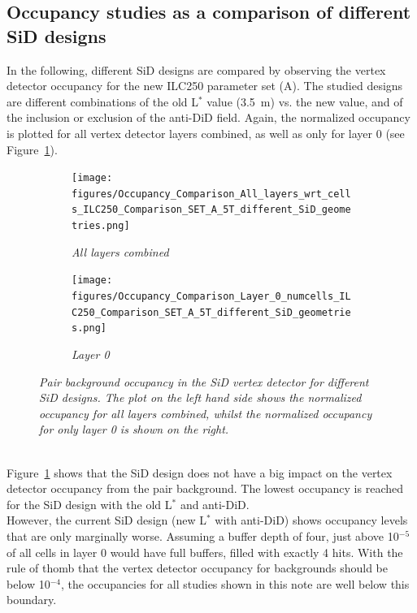 \subsection{Occupancy studies as a comparison of different SiD designs}
In the following, different SiD designs are compared by observing the vertex detector occupancy for the new ILC250 parameter set (A).
The studied designs are different combinations of the old L$^*$ value (\SI{3.5}{\meter}) vs. the new value, and of the inclusion or exclusion of the anti-DiD field.
Again, the normalized occupancy is plotted for all vertex detector layers combined, as well as only for layer 0 (see Figure~\ref{fig:SiD_comparison}).
\begin{figure}[!h]
\centering
\begin{subfigure}[t]{0.45\textwidth}
\centering
\texttt{[image: figures/Occupancy\_Comparison\_All\_layers\_wrt\_cells\_ILC250\_Comparison\_SET\_A\_5T\_different\_SiD\_geometries.png]}
\caption{\textit{All layers combined}}
\end{subfigure}
\hspace*{0.3cm}
\begin{subfigure}[t]{0.45\textwidth}
\centering
\texttt{[image: figures/Occupancy\_Comparison\_Layer\_0\_numcells\_ILC250\_Comparison\_SET\_A\_5T\_different\_SiD\_geometries.png]}
\caption{\textit{Layer 0}}
\end{subfigure}
\caption{\textit{Pair background occupancy in the SiD vertex detector for different SiD designs.
The plot on the left hand side shows the normalized occupancy for all layers combined, whilst the normalized occupancy for only layer 0 is shown on the right.}}
\label{fig:SiD_comparison}
\end{figure}
\\Figure~\ref{fig:SiD_comparison} shows that the SiD design does not have a big impact on the vertex detector occupancy from the pair background. 
The lowest occupancy is reached for the SiD design with the old L$^*$ and anti-DiD.\\
However, the current SiD design (new L$^*$ with anti-DiD) shows occupancy levels that are only marginally worse.
Assuming a buffer depth of four, just above 10$^{-5}$ of all cells in layer 0 would have full buffers, filled with exactly 4 hits.
With the rule of thomb that the vertex detector occupancy for backgrounds should be below 10$^{-4}$, the occupancies for all studies shown in this note are well below this boundary.